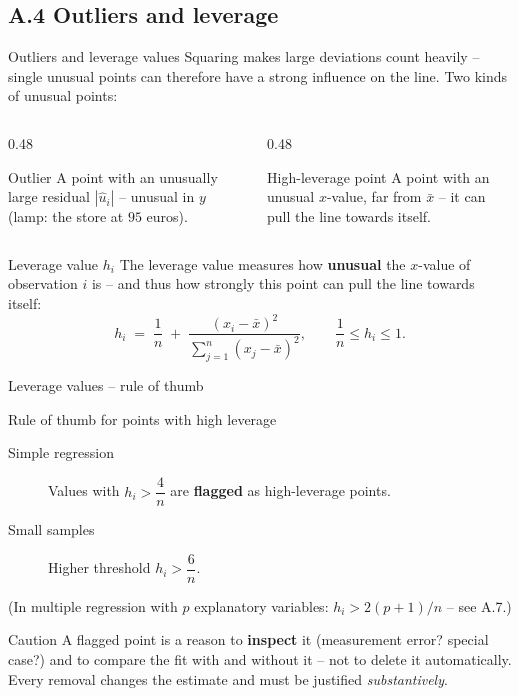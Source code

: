 \documentclass[aspectratio=169,11pt]{beamer}
\begin{document}
\subsection{A.4 Outliers and leverage}

\begin{frame}{Outliers and leverage values}
  \small
  Squaring makes large deviations count heavily -- single unusual points can
  therefore have a strong influence on the line. Two kinds of unusual points:
  \begin{columns}[T]
    \begin{column}{0.48\textwidth}
      \begin{block}{Outlier}
        A point with an unusually large residual $|\hat u_i|$ -- unusual
        in $y$ (lamp: the store at $95$ euros).
      \end{block}
    \end{column}
    \begin{column}{0.48\textwidth}
      \begin{block}{High-leverage point}
        A point with an unusual $x$-value, far from $\bar x$ -- it can pull
        the line towards itself.
      \end{block}
    \end{column}
  \end{columns}

  \begin{block}{Leverage value $h_i$}
    The leverage value measures how \textbf{unusual} the $x$-value of
    observation $i$ is -- and thus how strongly this point can pull the line
    towards itself:
    \[
        h_i \;=\; \frac{1}{n} \;+\;
        \frac{(x_i - \bar{x})^{2}}{\sum_{j=1}^{n}(x_j - \bar{x})^{2}},
        \qquad \frac1n\le h_i\le 1 .
    \]
    \vspace{-10pt}
  \end{block}
\end{frame}

\begin{frame}{Leverage values -- rule of thumb}
  \begin{alertblock}{Rule of thumb for points with high leverage}
    \begin{description}
      \item[Simple regression] Values with $h_i > \dfrac{4}{n}$ are
            \textbf{flagged} as high-leverage points.
      \item[Small samples] Higher threshold $h_i > \dfrac{6}{n}$.
    \end{description}
    (In multiple regression with $p$ explanatory variables:
    $h_i>2(p+1)/n$ -- see A.7.)
  \end{alertblock}

  \begin{exampleblock}{Caution}
    A flagged point is a reason to \textbf{inspect} it (measurement error?
    special case?) and to compare the fit with and without it -- not to
    delete it automatically. Every removal changes the estimate and must be
    justified \emph{substantively}.
  \end{exampleblock}
\end{frame}
\end{document}
